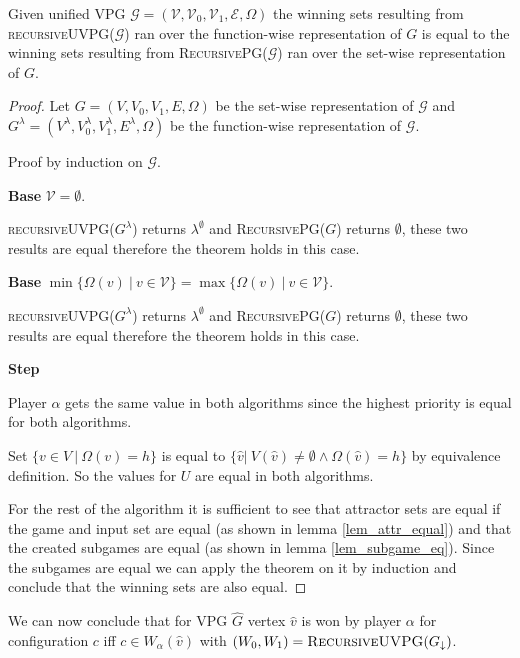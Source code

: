 \begin{theorem}
	Given unified VPG $\mathcal{G} = (\mathcal{V},\mathcal{V}_0,\mathcal{V}_1, \mathcal{E}, \Omega)$ the winning sets resulting from \textsc{recursiveUVPG($\mathcal{G}$)} ran over the function-wise representation of $G$ is equal to the winning sets resulting from \textsc{RecursivePG($\mathcal{G}$)} ran over the set-wise representation of $G$.
	\begin{proof}
		Let $G = (V,V_0,V_1,E,\Omega)$ be the set-wise representation of $\mathcal{G}$ and $G^\lambda = (V^\lambda, V^\lambda_0, V^\lambda_1, E^\lambda, \Omega)$ be the function-wise representation of $\mathcal{G}$.
		
		Proof by induction on $\mathcal{G}$.
		
		\textbf{Base} $\mathcal{V} = \emptyset$. 
		
		\textsc{recursiveUVPG($G^\lambda$)} returns $\lambda^\emptyset$ and \textsc{RecursivePG($G$)} returns $\emptyset$, these two results are equal therefore the theorem holds in this case.
		
		\textbf{Base} $\min\{\Omega(v)\ |\ v \in \mathcal{V}\} = \max\{\Omega(v)\ |\ v \in \mathcal{V}\}$.
		
		\textsc{recursiveUVPG($G^\lambda$)} returns $\lambda^\emptyset$ and \textsc{RecursivePG($G$)} returns $\emptyset$, these two results are equal therefore the theorem holds in this case.
		
		\textbf{Step}
		
		Player $\alpha$ gets the same value in both algorithms since the highest priority is equal for both algorithms.
		
		Set $\{v \in V\ |\ \Omega(v) = h\}$ is equal to $\{ \hat{v} |\ V(\hat{v}) \neq \emptyset \wedge \Omega(\hat{v}) = h\}$ by equivalence definition. So the values for $U$ are equal in both algorithms.
		
		For the rest of the algorithm it is sufficient to see that attractor sets are equal if the game and input set are equal (as shown in lemma \ref{lem_attr_equal}) and that the created subgames are equal (as shown in lemma \ref{lem_subgame_eq}). Since the subgames are equal we can apply the theorem on it by induction and conclude that the winning sets are also equal.
	\end{proof}
\end{theorem}

We can now conclude that for VPG $\hat{G}$ vertex $\hat{v}$ is won by player $\alpha$ for configuration $c$ iff $c \in W_\alpha(\hat{v})$ with $(W_0,W_1) = \textsc{RecursiveUVPG}(G_{\downarrow})$.

